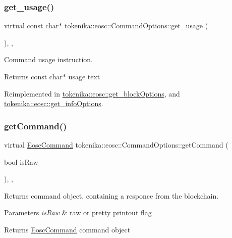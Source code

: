 \subsubsection{\texorpdfstring{get\+\_\+usage()}{get\_usage()}}
{\footnotesize\ttfamily virtual const char$\ast$ tokenika\+::eosc\+::\+Command\+Options\+::get\+\_\+usage (\begin{DoxyParamCaption}{ }\end{DoxyParamCaption})\hspace{0.3cm}{\ttfamily [inline]}, {\ttfamily [protected]}, {\ttfamily [virtual]}}



Command \textquotesingle{}usage\textquotesingle{} instruction. 

\begin{DoxyReturn}{Returns}
const char$\ast$ usage text 
\end{DoxyReturn}


Reimplemented in \hyperlink{classtokenika_1_1eosc_1_1get__block_options_a339878f62e1d3a3215e0dbf13ba405bf}{tokenika\+::eosc\+::get\+\_\+block\+Options}, and \hyperlink{classtokenika_1_1eosc_1_1get__info_options_a67f3f76293b998c120559d6af5bf6c6f}{tokenika\+::eosc\+::get\+\_\+info\+Options}.

\mbox{\label{classtokenika_1_1eosc_1_1_command_options_a787f15164e2055394d9d948c07bf201c}} 
\subsubsection{\texorpdfstring{get\+Command()}{getCommand()}}
{\footnotesize\ttfamily virtual \hyperlink{classtokenika_1_1eosc_1_1_eosc_command}{Eosc\+Command} tokenika\+::eosc\+::\+Command\+Options\+::get\+Command (\begin{DoxyParamCaption}\item[{bool}]{is\+Raw }\end{DoxyParamCaption})\hspace{0.3cm}{\ttfamily [inline]}, {\ttfamily [protected]}, {\ttfamily [virtual]}}



Returns command object, containing a responce from the blockchain. 


\begin{DoxyParams}{Parameters}
{\em is\+Raw} & raw or pretty printout flag \\
\hline
\end{DoxyParams}
\begin{DoxyReturn}{Returns}
\hyperlink{classtokenika_1_1eosc_1_1_eosc_command}{Eosc\+Command} command object 
\end{DoxyReturn}


